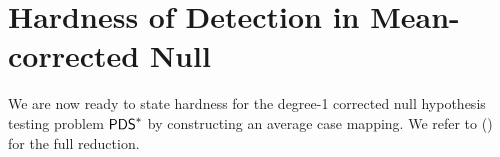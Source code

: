 \documentclass[final,12pt]{colt2023} %
\newcommand\1[1]{\mathbb{I}_{\left\{#1\right\}}}
\begin{document}
\section{Hardness of Detection in Mean-corrected Null}\label{thm1}
We are now ready to state hardness for the degree-1 corrected null hypothesis testing problem $\mathsf{PDS}^*$ by constructing an average case mapping. We refer to  () for the full reduction.



    
\end{document}
